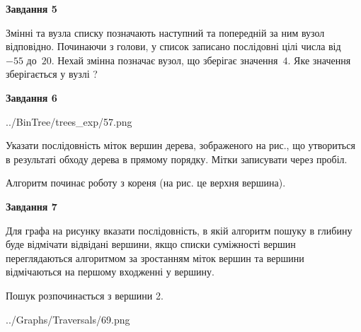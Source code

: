 \documentclass[12pt, ukrainian]{article}
\begin{document}
{\begin {large}
{\begin {center}\textbf{Завдання 5}\end {center}}\par
Змінні  та  вузла списку позначають наступний та попередній за ним вузол відповідно. Починаючи з голови, у список записано послідовні цілі числа від~$-55$ до~$20$. Нехай змінна  позначає вузол, що зберігає значення~$4$.
Яке значення зберігається у вузлі  ?\par
\newpage

{\begin {center}\textbf{Завдання 6}\end {center}}\par

\begin{center}
	{../BinTree/trees_exp/57.png}
\end{center}
Указати послідовність міток вершин дерева, зображеного на рис., що утвориться в результаті обходу дерева в прямому порядку. Мітки записувати через пробіл.\par Алгоритм починає роботу з кореня (на рис. це верхня вершина).\par
\newpage

{\begin {center}\textbf{Завдання 7}\end {center}}\par
Для графа на рисунку вказати послідовність, в якій алгоритм пошуку в глибину буде відмічати відвідані вершини, якщо списки суміжності вершин переглядаються алгоритмом за зростанням міток вершин та вершини відмічаються на першому вход\-женні у вершину.\par
Пошук розпочинається з вершини 2.\par

\begin{center}
	{../Graphs/Traversals/69.png}
\end{center}\par
\newpage


\end{large}}
\end{document}
